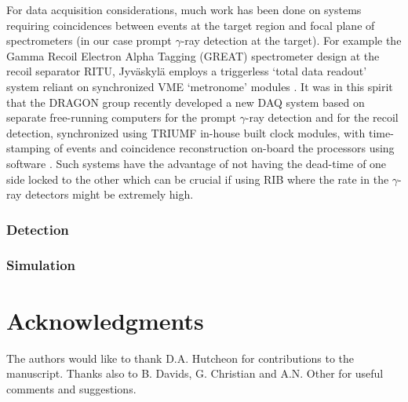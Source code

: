 For data acquisition considerations, much work has been done on systems requiring coincidences between events at the target region and focal plane of spectrometers (in our case prompt $\gamma$-ray detection at the target). For example the Gamma Recoil Electron Alpha Tagging (GREAT) spectrometer design at the recoil separator RITU, Jyv\"{a}skyl\"{a} \cite{pag03} employs a triggerless `total data readout' system reliant on synchronized VME `metronome' modules \cite{laz01}. It was in this spirit that the DRAGON group recently developed a new DAQ system based on separate free-running computers for the prompt $\gamma$-ray detection and for the recoil detection, synchronized using TRIUMF in-house built clock modules, with time-stamping of events and coincidence reconstruction on-board the processors using software \cite{chr14b}. Such systems have the advantage of not having the dead-time of one side locked to the other which can be crucial if using RIB where the rate in the $\gamma$-ray detectors might be extremely high. 

\subsubsection{Detection}















\subsubsection{Simulation}










\section{Acknowledgments}
The authors would like to thank D.A. Hutcheon for contributions to the manuscript. Thanks also to B. Davids, G. Christian and A.N. Other for useful comments and suggestions. 


